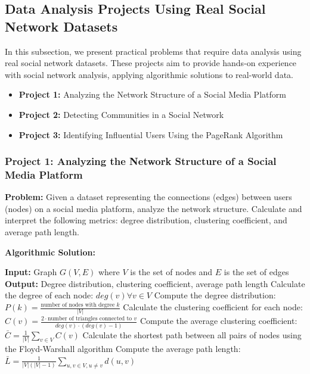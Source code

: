 \documentclass[12pt]{book} %
\begin{document}
\subsection{Data Analysis Projects Using Real Social Network Datasets}
In this subsection, we present practical problems that require data analysis using real social network datasets. These projects aim to provide hands-on experience with social network analysis, applying algorithmic solutions to real-world data.

\begin{itemize}
    \item \textbf{Project 1:} Analyzing the Network Structure of a Social Media Platform
    \item \textbf{Project 2:} Detecting Communities in a Social Network
    \item \textbf{Project 3:} Identifying Influential Users Using the PageRank Algorithm
\end{itemize}

\subsubsection*{Project 1: Analyzing the Network Structure of a Social Media Platform}
\textbf{Problem:} Given a dataset representing the connections (edges) between users (nodes) on a social media platform, analyze the network structure. Calculate and interpret the following metrics: degree distribution, clustering coefficient, and average path length.

\textbf{Algorithmic Solution:}
\begin{algorithm}
\caption{Network Structure Analysis}
\begin{algorithmic}
\State \textbf{Input:} Graph $G(V, E)$ where $V$ is the set of nodes and $E$ is the set of edges
\State \textbf{Output:} Degree distribution, clustering coefficient, average path length
\State Calculate the degree of each node: $deg(v) \forall v \in V$
\State Compute the degree distribution: $P(k) = \frac{\text{number of nodes with degree } k}{|V|}$
\State Calculate the clustering coefficient for each node: $C(v) = \frac{2 \cdot \text{number of triangles connected to } v}{deg(v) \cdot (deg(v) - 1)}$
\State Compute the average clustering coefficient: $\bar{C} = \frac{1}{|V|} \sum_{v \in V} C(v)$
\State Calculate the shortest path between all pairs of nodes using the Floyd-Warshall algorithm
\State Compute the average path length: $\bar{L} = \frac{1}{|V| (|V|-1)} \sum_{u,v \in V, u \neq v} d(u, v)$
\end{algorithmic}
\end{algorithm}
\end{document}
